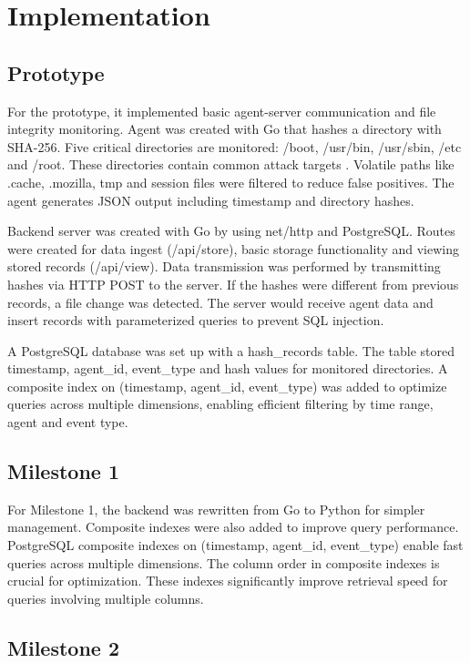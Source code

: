 \documentclass[conference]{IEEEtran}
\begin{document}
\section{Implementation}

\subsection{Prototype}

For the prototype, it implemented basic agent-server communication and file integrity monitoring. Agent was created with Go that hashes a directory with SHA-256. Five critical directories are monitored: /boot, /usr/bin, /usr/sbin, /etc and /root. These directories contain common attack targets \cite{abdullah}. Volatile paths like .cache, .mozilla, tmp and session files were filtered to reduce false positives. The agent generates JSON output including timestamp and directory hashes.

Backend server was created with Go by using net/http and PostgreSQL. Routes were created for data ingest (/api/store), basic storage functionality and viewing stored records (/api/view). Data transmission was performed by transmitting hashes via HTTP POST to the server. If the hashes were different from previous records, a file change was detected. The server would receive agent data and insert records with parameterized queries to prevent SQL injection.

A PostgreSQL database was set up with a hash\_records table. The table stored timestamp, agent\_id, event\_type and hash values for monitored directories. A composite index on (timestamp, agent\_id, event\_type) was added to optimize queries across multiple dimensions, enabling efficient filtering by time range, agent and event type.

\subsection{Milestone 1}

For Milestone 1, the backend was rewritten from Go to Python for simpler management. Composite indexes were also added to improve query performance. PostgreSQL composite indexes on (timestamp, agent\_id, event\_type) enable fast queries across multiple dimensions. The column order in composite indexes is crucial for optimization. These indexes significantly improve retrieval speed for queries involving multiple columns.

\subsection{Milestone 2}
\end{document}

